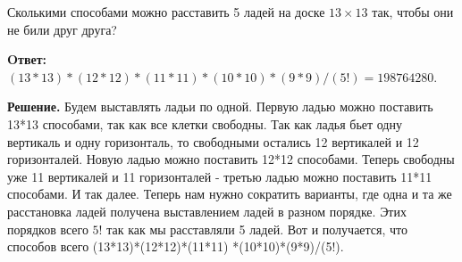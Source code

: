 Сколькими способами можно расставить 5 ладей на доске $13 \times 13$ так, чтобы они не били друг друга?

\textbf{Oтвет:} $(13 * 13) *(12 * 12) *(11 * 11) *(10 * 10) *(9 * 9) /(5!)=198764280$.

\textbf{Решение.}
Будем выставлять ладьи по одной. Первую ладью можно поставить 13*13 способами, так как все клетки свободны. Так как ладья бьет одну вертикаль и одну горизонталь, то свободными остались 12 вертикалей и 12 горизонталей. Новую ладью можно поставить 12*12 способами. Теперь свободны уже 11 вертикалей и 11 горизонталей - третью ладью можно поставить 11*11 способами. И так далее. Теперь нам нужно сократить варианты, где одна и та же расстановка ладей получена выставлением ладей в разном порядке. Этих порядков всего $5!$ так как мы расставляли 5 ладей. Вот и получается, что способов всего (13*13)*(12*12)*(11*11) *(10*10)*(9*9)/(5!).